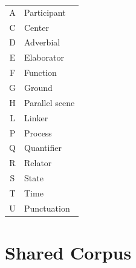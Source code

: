 \documentclass[extrafontsizes,60pt,twocolumn]{memoir}
\begin{document}
\begin{minipage}{.13\columnwidth}\color{white}
\renewcommand{\arraystretch}{1.5}
  \begin{adjustbox}{margin=.5in,frame,scale=.75,bgcolor=Navy}
  \begin{tabular}{>{\ttfamily\LARGE}c@{\hskip 1in\bfseries}l}
    A & Participant \\
    C & Center \\
    D & Adverbial \\
    E & Elaborator \\
    F & Function \\
    G & Ground \\
    H & Parallel scene \\
    L & Linker \\
    P & Process \\
    Q & Quantifier \\
    R & Relator \\
    S & State \\
    T & Time \\
    U & Punctuation
  \end{tabular}
  \end{adjustbox}
\end{minipage}
\hspace{-.6in}

\section*{Shared Corpus}
\end{document}
